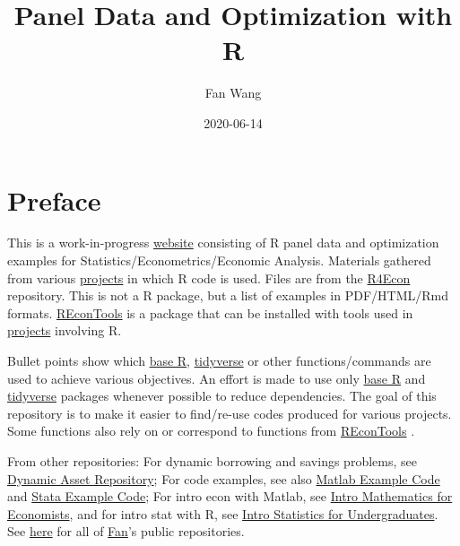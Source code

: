 \documentclass[
]{book}
\title{Panel Data and Optimization with R}
\author{Fan Wang}
\date{2020-06-14}
\begin{document}
\maketitle

{
\hypersetup{linkcolor=}
\setcounter{tocdepth}{1}
\tableofcontents
}
\hypertarget{preface}{%
\chapter*{Preface}\label{preface}}

This is a work-in-progress \href{https://fanwangecon.github.io/R4Econ/}{website} consisting of R panel data and optimization examples for Statistics/Econometrics/Economic Analysis. Materials gathered from various \href{https://fanwangecon.github.io/research}{projects} in which R code is used. Files are from the \href{https://github.com/FanWangEcon/R4Econ}{R4Econ} repository. This is not a R package, but a list of examples in PDF/HTML/Rmd formats. \href{https://fanwangecon.github.io/REconTools/}{REconTools} is a package that can be installed with tools used in \href{https://fanwangecon.github.io/research}{projects} involving R.

Bullet points show which \href{https://www.rdocumentation.org/packages/base/versions/3.5.2}{base R}, \href{https://www.tidyverse.org/}{tidyverse} or other functions/commands are used to achieve various objectives. An effort is made to use only \href{https://www.rdocumentation.org/packages/base/versions/3.5.2}{base R} \citep{R-base} and \href{https://www.tidyverse.org/}{tidyverse} \citep{R-tidyverse} packages whenever possible to reduce dependencies. The goal of this repository is to make it easier to find/re-use codes produced for various projects. Some functions also rely on or correspond to functions from \href{https://fanwangecon.github.io/REconTools/}{REconTools} \citep{R-REconTools}.

From other repositories: For dynamic borrowing and savings problems, see \href{https://fanwangecon.github.io/CodeDynaAsset/}{Dynamic Asset Repository}; For code examples, see also \href{https://fanwangecon.github.io/M4Econ/}{Matlab Example Code} and \href{https://fanwangecon.github.io/Stata4Econ/}{Stata Example Code}; For intro econ with Matlab, see \href{https://fanwangecon.github.io/Math4Econ/}{Intro Mathematics for Economists}, and for intro stat with R, see \href{https://fanwangecon.github.io/Stat4Econ/}{Intro Statistics for Undergraduates}. See \href{https://github.com/FanWangEcon}{here} for all of \href{https://fanwangecon.github.io/}{Fan}'s public repositories.
\end{document}

